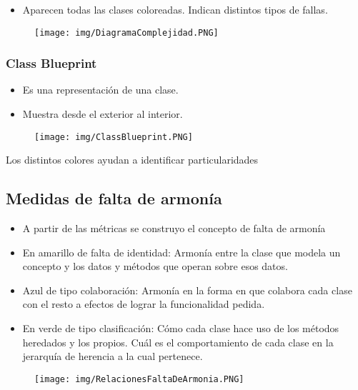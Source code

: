 \begin{itemize}
\item Aparecen todas las clases coloreadas. Indican distintos tipos de fallas.
\end{itemize}

\begin{figure}[!htb]
    \centering
    \texttt{[image: img/DiagramaComplejidad.PNG]}
\end{figure}

\subsubsection*{Class Blueprint}

\begin{itemize}
\item Es una representación de una clase.
\item Muestra desde el exterior al interior.
\end{itemize}

\begin{figure}[!htb]
    \centering
    \texttt{[image: img/ClassBlueprint.PNG]}
\end{figure}

Los distintos colores ayudan a identificar particularidades


\subsection*{Medidas de falta de armonía}
\begin{itemize}
\item A partir de las métricas se construyo el concepto de falta de armonía
\item En amarillo de falta de identidad: Armonía entre la clase que modela un concepto y los datos y métodos que operan sobre esos datos.
\item Azul de tipo colaboración: Armonía en la forma en que colabora cada clase con el resto a efectos de lograr la funcionalidad pedida.
\item En verde de tipo clasificación: Cómo cada clase hace uso de los métodos heredados y los propios. Cuál es el comportamiento de cada clase en la jerarquía de herencia a la cual pertenece.
\end{itemize}


\begin{figure}[!htb]
    \centering
    \texttt{[image: img/RelacionesFaltaDeArmonia.PNG]}
\end{figure}


